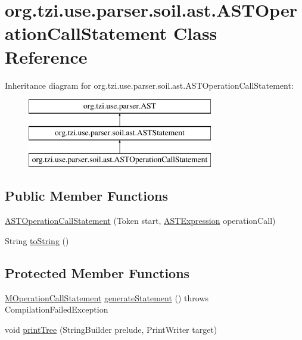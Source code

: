\hypertarget{classorg_1_1tzi_1_1use_1_1parser_1_1soil_1_1ast_1_1_a_s_t_operation_call_statement}{\section{org.\-tzi.\-use.\-parser.\-soil.\-ast.\-A\-S\-T\-Operation\-Call\-Statement Class Reference}
\label{classorg_1_1tzi_1_1use_1_1parser_1_1soil_1_1ast_1_1_a_s_t_operation_call_statement}
}
Inheritance diagram for org.\-tzi.\-use.\-parser.\-soil.\-ast.\-A\-S\-T\-Operation\-Call\-Statement\-:\begin{figure}[H]
\begin{center}
\leavevmode
\includegraphics[height=3.000000cm]{classorg_1_1tzi_1_1use_1_1parser_1_1soil_1_1ast_1_1_a_s_t_operation_call_statement}
\end{center}
\end{figure}
\subsection*{Public Member Functions}
\begin{DoxyCompactItemize}
\item 
\hyperlink{classorg_1_1tzi_1_1use_1_1parser_1_1soil_1_1ast_1_1_a_s_t_operation_call_statement_a5e5b4c5bfb1ca7785d3746dbaffeca1f}{A\-S\-T\-Operation\-Call\-Statement} (Token start, \hyperlink{classorg_1_1tzi_1_1use_1_1parser_1_1ocl_1_1_a_s_t_expression}{A\-S\-T\-Expression} operation\-Call)
\item 
String \hyperlink{classorg_1_1tzi_1_1use_1_1parser_1_1soil_1_1ast_1_1_a_s_t_operation_call_statement_a733157255d7fc816e83eca012a162cd1}{to\-String} ()
\end{DoxyCompactItemize}
\subsection*{Protected Member Functions}
\begin{DoxyCompactItemize}
\item 
\hyperlink{classorg_1_1tzi_1_1use_1_1uml_1_1sys_1_1soil_1_1_m_operation_call_statement}{M\-Operation\-Call\-Statement} \hyperlink{classorg_1_1tzi_1_1use_1_1parser_1_1soil_1_1ast_1_1_a_s_t_operation_call_statement_a009f2f36a8302e6d5228c4065cb40577}{generate\-Statement} ()  throws Compilation\-Failed\-Exception 
\item 
void \hyperlink{classorg_1_1tzi_1_1use_1_1parser_1_1soil_1_1ast_1_1_a_s_t_operation_call_statement_a74b78cfef979df6a903f51b8e2cdb572}{print\-Tree} (String\-Builder prelude, Print\-Writer target)
\end{DoxyCompactItemize}
